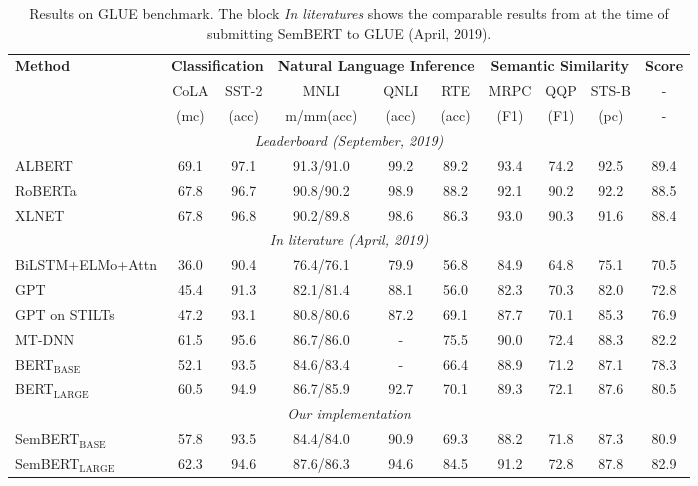 \documentclass[letterpaper]{article} \usepackage{aaai20}  \usepackage{times}  \usepackage{helvet} \usepackage{courier}  \usepackage[hyphens]{url}  \usepackage{graphicx} \urlstyle{rm} \def\UrlFont{\rm}  \usepackage{graphicx}  \frenchspacing  \usepackage{amssymb}
\begin{document}
\begin{table*}
	\centering
	\resizebox{\linewidth}{!}
	{
		\begin{tabular}{lccccccccc}
			\hline
			
			\hline
			\textbf{Method} &  \multicolumn{2}{c}{\textbf{Classification}} &\multicolumn{3}{c}{\textbf{Natural Language Inference}} & \multicolumn{3}{c}{\textbf{Semantic Similarity}} &  \textbf{Score}\\
			
			& CoLA & SST-2 & MNLI & QNLI & RTE  & MRPC  & QQP & STS-B & -\\ 
			&  (mc) & (acc)	& m/mm(acc) & (acc) & (acc)  & (F1) & (F1) & (pc) & -\\
			\hline
			\multicolumn{10}{c}{\emph{Leaderboard (September, 2019)}} \\
			ALBERT & 69.1 & 97.1 &  91.3/91.0 & 99.2 & 89.2  & 93.4 & 74.2  & 92.5  & 89.4\\
			RoBERTa & 67.8 & 96.7 & 90.8/90.2 & 98.9 & 88.2 & 92.1 & 90.2 & 92.2 & 88.5 \\
			XLNET & 67.8 & 96.8 & 90.2/89.8 & 98.6 & 86.3 & 93.0 & 90.3 & 91.6 & 88.4 \\
			\hline
			\multicolumn{10}{c}{\emph{In literature (April, 2019)}} \\
			BiLSTM+ELMo+Attn &36.0 & 90.4 &76.4/76.1&79.9& 56.8 &84.9&64.8  & 75.1 &  70.5\\
			GPT& 45.4 & 91.3  & 82.1/81.4 & 88.1 & 56.0 & 82.3  & 70.3 & 82.0 & 72.8\\
			GPT on STILTs & 47.2 & 93.1   & 80.8/80.6 & 87.2 & 69.1 & 87.7 & 70.1 &85.3  & 76.9\\
			MT-DNN & 61.5 & 95.6   & 86.7/86.0 & - & 75.5 & 90.0 & 72.4 & 88.3  & 82.2\\
			\hdashline
			BERT$_\text{BASE}$  & 52.1 & 93.5  & 84.6/83.4 &  - & 66.4 & 88.9 & 71.2  & 87.1 & 78.3\\
			BERT$_\text{LARGE}$ &60.5 & 94.9 &  86.7/85.9 & 92.7 & 70.1  & 89.3 & 72.1 & 87.6 & 80.5\\
			\hline
			\multicolumn{10}{c}{\emph{Our implementation}} \\
			SemBERT$_\text{BASE}$   & 57.8 &93.5 &84.4/84.0 & 90.9 & 69.3  & 88.2 & 71.8 & 87.3 &  80.9\\
			SemBERT$_\text{LARGE}$ & 62.3 & 94.6 & 87.6/86.3 & 94.6 & 84.5 & 91.2 & 72.8 & 87.8 &  82.9\\
			\hline
			
			\hline
		\end{tabular}
	}
	
	\caption{\label{tab:glue} Results on GLUE benchmark. The block \emph{In literatures} shows the  comparable results from \cite{liu2019multi,radford2018improving} at the time of submitting SemBERT to GLUE (April, 2019).
	}
	
\end{table*}
\end{document}
